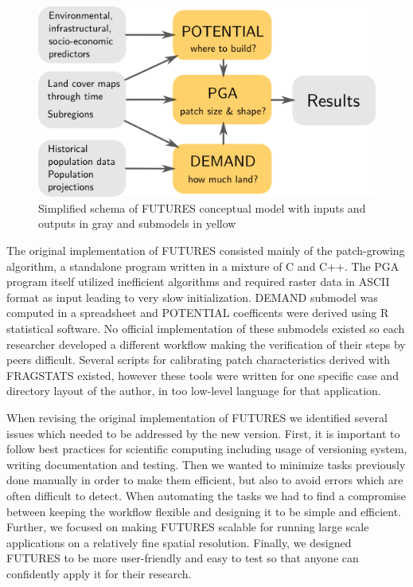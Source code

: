 \documentclass{isprs}
\begin{document}
\begin{figure}[h!]
 \centering
 \includegraphics[width=0.9\columnwidth]{./figures/schema.png}
 \caption{Simplified schema of FUTURES conceptual model  with inputs and outputs in gray and submodels in yellow}
 \label{fig:schema}
\end{figure}



The original implementation of FUTURES consisted mainly of the patch-growing 
algorithm, a standalone program written in a mixture of C and C++.
The PGA program itself utilized inefficient algorithms and required raster data in ASCII
format as input leading to very slow initialization. %
DEMAND submodel was computed in a spreadsheet and POTENTIAL coefficents
were derived using R statistical software. No official
implementation of these submodels existed so each researcher
developed a different workflow making the verification of their steps
by peers difficult.
%
Several scripts for calibrating patch 
characteristics derived with FRAGSTATS \cite{fragstats} existed, however these tools
were written for one specific case and directory layout of the author,
in too low-level language for that application.

When revising the original implementation of FUTURES we identified
several issues which needed to be addressed by the new version.
First, it is important to follow best practices for scientific computing \cite{wilson2014best}
including usage of versioning system, writing documentation and testing.
Then we wanted to minimize tasks previously done manually in order to make
them efficient, but also to avoid errors which are often difficult to detect.
When automating the tasks we had to find a compromise between keeping the workflow flexible
and designing it to be simple and efficient.
Further, we focused on making FUTURES scalable for running large scale applications
on a relatively fine spatial resolution.
Finally, we designed FUTURES to be more user-friendly and easy to test so that
anyone can confidently apply it for their research.
\end{document}
